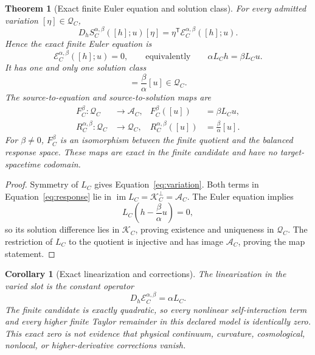 \documentclass[11pt]{article}
\newtheorem{theorem}{Theorem}
\newtheorem{corollary}{Corollary}
\newcommand{\Kspace}{\mathcal K_C}
\newcommand{\Qspace}{\mathcal Q_C}
\newcommand{\Aspace}{\mathcal A_C}
\newcommand{\Eop}{\mathcal E_C^{\alpha,\beta}}
\begin{document}
\begin{theorem}[Exact finite Euler equation and solution class]
\label{thm:euler}
For every admitted variation \([\eta]\in\Qspace\),
\begin{equation}
 D_hS_C^{\alpha,\beta}([h];u)[\eta]
 =\eta^{\mathsf T}\Eop([h];u).
 \label{eq:variation}
\end{equation}
Hence the exact finite Euler equation is
\begin{equation}
 \Eop([h];u)=0,
 \qquad\text{equivalently}\qquad
 \alpha L_Ch=\beta L_Cu.
 \label{eq:euler}
\end{equation}
It has one and only one solution class
\begin{equation}
 [h]=\frac{\beta}{\alpha}[u]\in\Qspace.
 \label{eq:solution}
\end{equation}
The source-to-equation and source-to-solution maps are
\begin{align}
 F_C^{\beta}:\Qspace&\longrightarrow\Aspace,
 &F_C^{\beta}([u])&=\beta L_Cu,\\
 R_C^{\alpha,\beta}:\Qspace&\longrightarrow\Qspace,
 &R_C^{\alpha,\beta}([u])&=\frac{\beta}{\alpha}[u].
 \label{eq:maps}
\end{align}
For \(\beta\ne0\), \(F_C^\beta\) is an isomorphism between the finite
quotient and the balanced response space.  These maps are exact in the
finite candidate and have no target-spacetime codomain.
\end{theorem}

\begin{proof}
Symmetry of \(L_C\) gives Equation~\eqref{eq:variation}.  Both terms in
Equation~\eqref{eq:response} lie in
\(\operatorname{im}L_C=\Kspace^\perp=\Aspace\).  The Euler equation implies
\[
 L_C\!\left(h-\frac{\beta}{\alpha}u\right)=0,
\]
so its solution difference lies in \(\Kspace\), proving existence and
uniqueness in \(\Qspace\).  The restriction of \(L_C\) to the quotient is
injective and has image \(\Aspace\), proving the map statement.
\end{proof}

\begin{corollary}[Exact linearization and corrections]
\label{cor:linearization}
The linearization in the varied slot is the constant operator
\begin{equation}
 D_h\Eop=\alpha L_C.
\end{equation}
The finite candidate is exactly quadratic, so every nonlinear
self-interaction term and every higher finite Taylor remainder in this
declared model is identically zero.  This exact zero is not evidence that
physical continuum, curvature, cosmological, nonlocal, or
higher-derivative corrections vanish.
\end{corollary}
\end{document}
